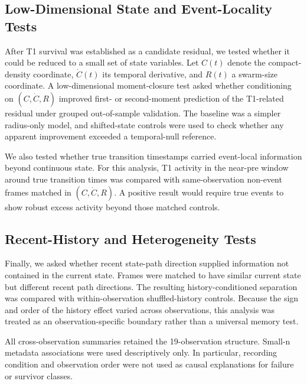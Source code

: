 \subsection{Low-Dimensional State and Event-Locality Tests}

After T1 survival was established as a candidate residual, we tested whether it
could be reduced to a small set of state variables. Let $C(t)$ denote the
compact-density coordinate, $\dot{C}(t)$ its temporal derivative, and $R(t)$ a
swarm-size coordinate. A low-dimensional moment-closure test asked whether
conditioning on $(C,\dot{C},R)$ improved first- or second-moment prediction of
the T1-related residual under grouped out-of-sample validation. The baseline
was a simpler radius-only model, and shifted-state controls were used to check
whether any apparent improvement exceeded a temporal-null reference.

We also tested whether true transition timestamps carried event-local
information beyond continuous state. For this analysis, T1 activity in the
near-pre window around true transition times was compared with
same-observation non-event frames matched in $(C,\dot{C},R)$. A positive result
would require true events to show robust excess activity beyond those matched
controls.

\subsection{Recent-History and Heterogeneity Tests}

Finally, we asked whether recent state-path direction supplied information
not contained in the current state. Frames were matched to have similar current
state but different recent path directions. The resulting history-conditioned
separation was compared with within-observation shuffled-history controls.
Because the sign and order of the history effect varied across observations,
this analysis was treated as an observation-specific boundary rather than a
universal memory test.

All cross-observation summaries retained the 19-observation structure. Small-n
metadata associations were used descriptively only. In particular, recording
condition and observation order were not used as causal explanations for
failure or survivor classes.

